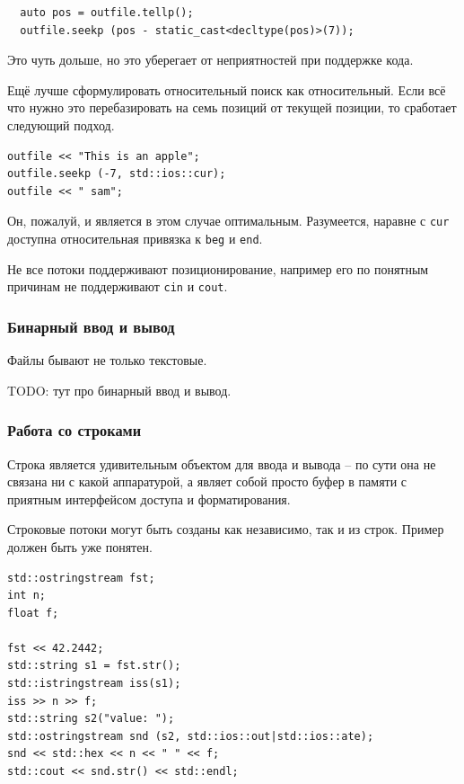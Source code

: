 \documentclass[a4paper,12pt,oneside]{article}
\begin{document}
\begin{lstlisting}
  auto pos = outfile.tellp();
  outfile.seekp (pos - static_cast<decltype(pos)>(7));
\end{lstlisting}

Это чуть дольше, но это уберегает от неприятностей при поддержке кода.

Ещё лучше сформулировать относительный поиск как относительный. Если всё что нужно это перебазировать на семь позиций от текущей позиции, то сработает следующий подход.

\begin{lstlisting}
outfile << "This is an apple";
outfile.seekp (-7, std::ios::cur);
outfile << " sam";
\end{lstlisting}

Он, пожалуй, и является в этом случае оптимальным. Разумеется, наравне с \lstinline!cur! доступна относительная привязка к \lstinline!beg! и \lstinline!end!.

Не все потоки поддерживают позиционирование, например его по понятным причинам не поддерживают \lstinline!cin! и \lstinline!cout!.

\subsubsection{Бинарный ввод и вывод}

Файлы бывают не только текстовые. 

TODO: тут про бинарный ввод и вывод.

\subsubsection{Работа со строками}\label{subsub:strstream}

Строка является удивительным объектом для ввода и вывода -- по сути она не связана ни с какой аппаратурой, а являет собой просто буфер в памяти с приятным интерфейсом доступа и форматирования.

Строковые потоки могут быть созданы как независимо, так и из строк. Пример должен быть уже понятен.

\begin{lstlisting}
std::ostringstream fst;
int n;
float f;

fst << 42.2442;
std::string s1 = fst.str();
std::istringstream iss(s1);
iss >> n >> f;
std::string s2("value: ");
std::ostringstream snd (s2, std::ios::out|std::ios::ate);
snd << std::hex << n << " " << f;
std::cout << snd.str() << std::endl;
\end{lstlisting}
\end{document}
